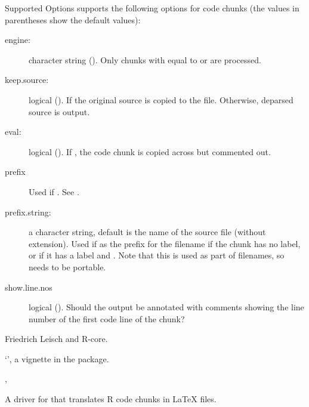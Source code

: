 \begin{Section}{Supported Options}
 supports the following options for code chunks (the
values in parentheses show the default values):
\begin{description}

\item[engine:] character string ().  Only chunks with
 equal to  or  are processed.

\item[keep.source:] logical ().  If  the original source is copied to the file.  Otherwise,
deparsed source is output.

\item[eval:] logical ().  If , the code chunk
is copied across but commented out.

\item[prefix] Used if .  See .

\item[prefix.string:] a character string, default is the name of the
source file (without extension).  Used if  as
the prefix for the filename if the chunk has no label, or if it
has a label and .  Note that this is used as
part of filenames, so needs to be portable.

\item[show.line.nos] logical ().  Should the output be
annotated with comments showing the line number of the first code line
of the chunk?

\end{description}

\end{Section}
%
\begin{Author}\relax
Friedrich Leisch and R-core.
\end{Author}
%
\begin{SeeAlso}\relax
`', a vignette in
the  package.

, 
\end{SeeAlso}
%
\begin{Description}\relax
A driver for  that translates R code chunks in
LaTeX files.
\end{Description}
